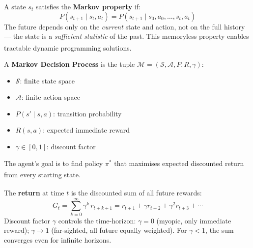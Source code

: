     \begin{tcbitemize}[ skin=sectionraster ]

        \tcbitem[title=The Markov Property, raster multicolumn=3]
        A state $s_t$ satisfies the \textbf{Markov property} if:
        \begin{equation}
            P(s_{t+1} \mid s_t, a_t) = P(s_{t+1} \mid s_0, a_0, \ldots, s_t, a_t)
        \end{equation}
        The future depends only on the \emph{current} state and action, not
        on the full history --- the state is a \emph{sufficient statistic} of
        the past. This memoryless property enables tractable dynamic
        programming solutions.\textsuperscript{\cite[][p.~140]{barberBayesianReasoningMachine2012}}

        \tcbitem[title={MDP: Formal Definition}, raster multicolumn=3]
        A \textbf{Markov Decision Process} is the tuple
        $\mathcal{M} = (\mathcal{S}, \mathcal{A}, P, R, \gamma)$:
        \begin{itemize}
            \item $\mathcal{S}$: finite state space
            \item $\mathcal{A}$: finite action space
            \item $P(s' \mid s, a)$: transition probability
            \item $R(s, a)$: expected immediate reward
            \item $\gamma \in [0,1]$: discount factor
        \end{itemize}
        The agent's goal is to find policy $\pi^*$ that maximises expected
        discounted return from every starting
        state.\textsuperscript{\cite[][p.~141]{barberBayesianReasoningMachine2012}}

        \tcbitem[title={Cumulative Discounted Return $G_t$}, raster multicolumn=6]
        The \textbf{return} at time $t$ is the discounted sum of all future
        rewards:\textsuperscript{\cite[][p.~142]{barberBayesianReasoningMachine2012}}
        \tcblower
        \begin{equation}
            G_t = \sum_{k=0}^{\infty} \gamma^k\, r_{t+k+1}
                = r_{t+1} + \gamma r_{t+2} + \gamma^2 r_{t+3} + \cdots
        \end{equation}
        Discount factor $\gamma$ controls the time-horizon:
        $\gamma = 0$ (myopic, only immediate reward);
        $\gamma \to 1$ (far-sighted, all future equally weighted).
        For $\gamma < 1$, the sum converges even for infinite horizons.


\end{tcbitemize}
